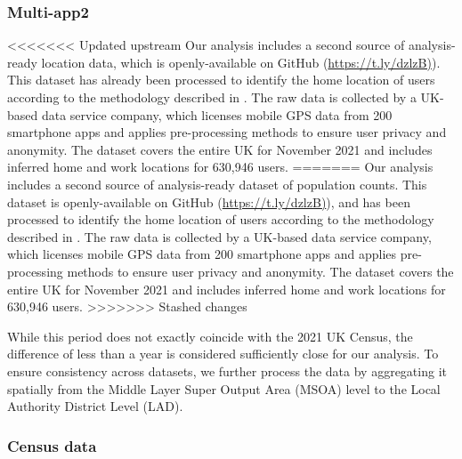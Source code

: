 \documentclass[]{rsos}%
\begin{document}
\subsubsection{Multi-app2}\label{multi-app2}

<<<<<<< Updated upstream
Our analysis includes a second source of analysis-ready location data,
which is openly-available on GitHub
(\href{https://t.ly/dzlzB}{https://t.ly/dzlzB)}). This dataset has already
been processed to identify the home location of users according to the
methodology described in \citep{zhong24working}. The raw data is collected by
a UK-based data service company, which licenses mobile GPS data from 200
smartphone apps and applies pre-processing methods to ensure user
privacy and anonymity. The dataset covers the entire UK for November
2021 and includes inferred home and work locations for 630,946 users.
=======
Our analysis includes a second source of analysis-ready dataset of
population counts. This dataset is openly-available on GitHub
(\href{https://t.ly/dzlzB}{https://t.ly/dzlzB)}), and has been processed to
identify the home location of users according to the methodology
described in \citep{zhong24working}. The raw data is collected by a UK-based
data service company, which licenses mobile GPS data from 200 smartphone
apps and applies pre-processing methods to ensure user privacy and
anonymity. The dataset covers the entire UK for November 2021 and
includes inferred home and work locations for 630,946 users.
>>>>>>> Stashed changes

While this period does not exactly coincide with the 2021 UK Census, the
difference of less than a year is considered sufficiently close for our
analysis. To ensure consistency across datasets, we further process the
data by aggregating it spatially from the Middle Layer Super Output Area
(MSOA) level to the Local Authority District Level (LAD).

\subsubsection{Census data}\label{census-data}
\end{document}
